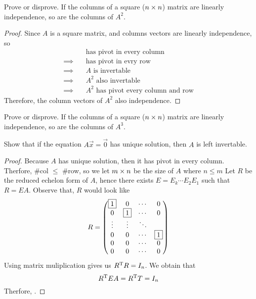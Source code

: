 \setcounter{exercise}{5}
\begin{exercise}
  Prove or disprove. If the columns of a square ($n\times n$)
  matrix are linearly independence, so are the columns of $A^2$.
\end{exercise}
\begin{proof}
  Since $A$ is a square matrix, and columns vectors are linearly 
  independence, so
  \begin{align*}
    &\text{has pivot in every column}\\\implies\quad
    &\text{has pivot in evry row}\\\implies\quad
    &A\text{ is invertable}\\\implies\quad
    &A^2\text{ also invertable}\\\implies\quad
    &A^2\text{ has pivot every column and row}
  \end{align*}
  Therefore, the column vectors of $A^2$ also independence.
\end{proof}
\begin{exercise}
  Prove or disprove. If the columns of a square ($n\times n$)
  matrix are linearly independence, so are the columns of $A^3$.
\end{exercise}
\begin{exercise}
  Show that if the equation $A\vec{x}=\vec{0}$ has unique solution,
  then $A$ is left invertable.
\end{exercise}
\begin{proof}
  Because $A$ has unique solution, then it has pivot in every
  column. Therfore, \#col $\leq$ \#row, so we let $m\times n$ be the size
  of $A$ where $n\leq m$
  Let $R$ be the reduced 
  echelon form of $A$, hence there exists $E=E_k\cdots E_2E_1$
  such that $R=EA$.
  Observe that, $R$ would look like
  \[
    R=
    \begin{pmatrix}
      \fbox{1} &0  &\cdots &0\\
      0 &\fbox{1}  &\cdots &0\\
      \vdots&\vdots&\ddots & \\
      0 &0  &\cdots &\fbox{1}\\
      0 &0  &\cdots &0\\
      0 &0  &\cdots &0\\
    \end{pmatrix}
  \]
  Using matrix muliplication gives us $R^\mathrm{T} R=I_n$. We obtain that
  \[
    R^\mathrm{T} EA=R^\mathrm{T} T=I_n
  \]
  Therfore, 
  .



\end{proof}
